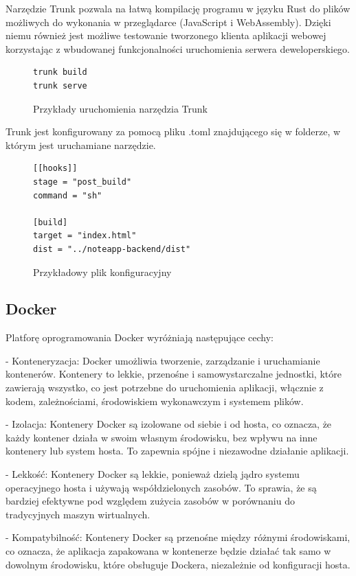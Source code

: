 \documentclass[a4paper,twoside,12pt]{book}
\begin{document}
Narzędzie Trunk pozwala na łatwą kompilację programu w języku Rust do plików możliwych do wykonania
w przeglądarce (JavaScript i WebAssembly). Dzięki niemu również jest możliwe testowanie tworzonego klienta
aplikacji webowej korzystając z wbudowanej funkcjonalności uruchomienia serwera deweloperskiego.

\begin{figure}
\centering
\begin{lstlisting}
trunk build
trunk serve
\end{lstlisting}
\caption{Przykłady uruchomienia narzędzia Trunk}
\label{fig:pseudokod:listings}
\end{figure}

Trunk jest konfigurowany za pomocą pliku .toml znajdującego się w folderze, w którym jest uruchamiane narzędzie.

\begin{figure}
\centering
\begin{lstlisting}
[[hooks]]
stage = "post_build"
command = "sh"

[build]
target = "index.html"
dist = "../noteapp-backend/dist"
\end{lstlisting}
\caption{Przykładowy plik konfiguracyjny}
\label{fig:pseudokod:trunk_conf}
\end{figure}

\subsection{Docker}

Platforę oprogramowania Docker wyróżniają następujące cechy:

- Konteneryzacja:
    Docker umożliwia tworzenie, zarządzanie i uruchamianie kontenerów. Kontenery to lekkie, przenośne i samowystarczalne jednostki, które zawierają wszystko, co jest potrzebne do uruchomienia aplikacji, włącznie z kodem, zależnościami, środowiskiem wykonawczym i systemem plików.

- Izolacja:
    Kontenery Docker są izolowane od siebie i od hosta, co oznacza, że każdy kontener działa w swoim własnym środowisku, bez wpływu na inne kontenery lub system hosta. To zapewnia spójne i niezawodne działanie aplikacji.

- Lekkość:
    Kontenery Docker są lekkie, ponieważ dzielą jądro systemu operacyjnego hosta i używają współdzielonych zasobów. To sprawia, że są bardziej efektywne pod względem zużycia zasobów w porównaniu do tradycyjnych maszyn wirtualnych.

- Kompatybilność:
    Kontenery Docker są przenośne między różnymi środowiskami, co oznacza, że aplikacja zapakowana w kontenerze będzie działać tak samo w dowolnym środowisku, które obsługuje Dockera, niezależnie od konfiguracji hosta.
\end{document}

